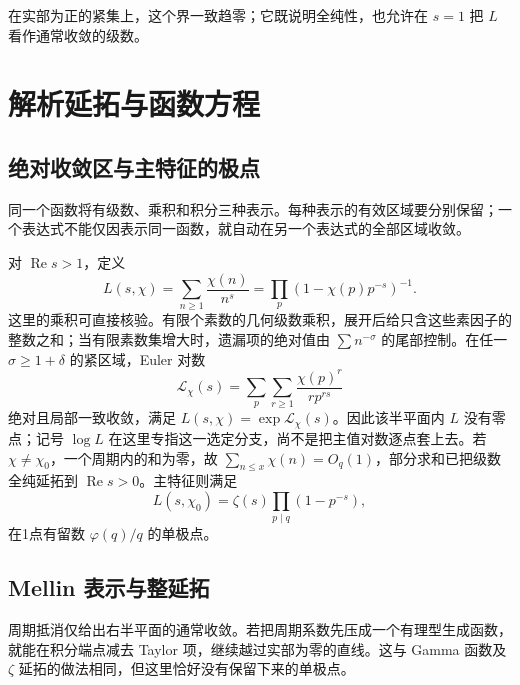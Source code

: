 在实部为正的紧集上，这个界一致趋零；它既说明全纯性，也允许在 \(s=1\) 把 \(L\) 看作通常收敛的级数。


\section{解析延拓与函数方程}
\label{b3:sec:D02}

\subsection{绝对收敛区与主特征的极点}
\label{b3:subsec:D0201}

同一个函数将有级数、乘积和积分三种表示。每种表示的有效区域要分别保留；一个表达式不能仅因表示同一函数，就自动在另一个表达式的全部区域收敛。

对 \(\operatorname{Re}s>1\)，定义
\[
 L(s,\chi)=\sum_{n\ge1}\frac{\chi(n)}{n^s}
     =\prod_p(1-\chi(p)p^{-s})^{-1}.
\]
这里的乘积可直接核验。有限个素数的几何级数乘积，展开后给只含这些素因子的整数之和；当有限素数集增大时，遗漏项的绝对值由 \(\sum n^{-\sigma}\) 的尾部控制。在任一 \(\sigma\ge1+\delta\) 的紧区域，Euler 对数
\[
 \mathcal L_\chi(s)=\sum_p\sum_{r\ge1}\frac{\chi(p)^r}{r p^{rs}}
\]
绝对且局部一致收敛，满足 \(L(s,\chi)=\exp\mathcal L_\chi(s)\)。因此该半平面内 \(L\) 没有零点；记号 \(\log L\) 在这里专指这一选定分支，尚不是把主值对数逐点套上去。若 \(\chi\ne\chi_0\)，一个周期内的和为零，故 \(\sum_{n\le x}\chi(n)=O_q(1)\)，部分求和已把级数全纯延拓到 \(\operatorname{Re}s>0\)。主特征则满足
\[
 L(s,\chi_0)=\zeta(s)\prod_{p\mid q}(1-p^{-s}),
\]
在1点有留数 \(\varphi(q)/q\) 的单极点。

\subsection{Mellin 表示与整延拓}
\label{b3:subsec:D0202}

周期抵消仅给出右半平面的通常收敛。若把周期系数先压成一个有理型生成函数，就能在积分端点减去 Taylor 项，继续越过实部为零的直线。这与 Gamma 函数及 \(\zeta\) 延拓的做法相同，但这里恰好没有保留下来的单极点。

